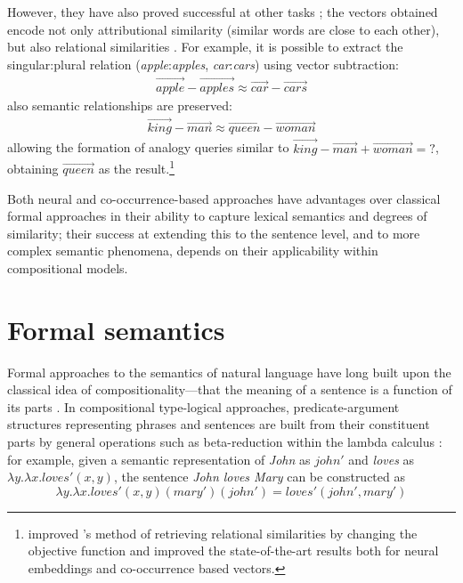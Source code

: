However, they have also proved successful at other tasks
\cite{mikolov2013linguistic}; the vectors obtained encode not only
attributional similarity (similar words are close to each other), but
also relational similarities \cite{turney2006similarity}. For example,
it is possible to extract the singular:plural relation
(\textit{apple}:\textit{apples}, \textit{car}:\textit{cars}) using
vector subtraction:
%
\begin{align*}
  \overrightarrow{\mathit{apple}} - \overrightarrow{\mathit{apples}}
  \approx
  \overrightarrow{\mathit{car}} - \overrightarrow{\mathit{cars}}
\end{align*}
%
also semantic relationships are preserved:
%
\begin{align*}
  \overrightarrow{\mathit{king}} - \overrightarrow{\mathit{man}}
  \approx
  \overrightarrow{\mathit{queen}} - \overrightarrow{\mathit{woman}}
\end{align*}
%
allowing the formation of analogy queries similar to
$\overrightarrow{\mathit{king}} - \overrightarrow{\mathit{man}} +
\overrightarrow{\mathit{woman}} = \mathtt{?}$, obtaining
$\overrightarrow{\mathit{queen}}$ as the
result.\footnote{ improved
  's method of retrieving relational similarities
  by changing the objective function and improved the state-of-the-art results
  both for neural embeddings and co-occurrence based vectors.}

Both neural and co-occurrence-based approaches have advantages over
classical formal approaches in their ability to capture lexical
semantics and degrees of similarity; their success at extending this
to the sentence level, and to more complex semantic phenomena, depends
on their applicability within compositional models.

\section{Formal semantics}
\label{sec:formal-semantics}

Formal approaches to the semantics of natural language have long built upon the
classical idea of compositionality---that the meaning of a sentence is a
function of its parts \cite{Janssen2001}. In compositional type-logical
approaches, predicate-argument structures representing phrases and sentences are
built from their constituent parts by general operations such as beta-reduction
within the lambda calculus \cite{THEO:THEO373}: for example, given a semantic
representation of \emph{John} as $\mathit{john}'$ and \emph{loves} as
$\lambda y.\lambda x.\mathit{loves}'(x, y)$, the sentence \emph{John loves Mary}
can be constructed as
$$
\lambda y.\lambda
x.\mathit{loves}'(x, y)(\mathit{mary}')(\mathit{john}') =
\mathit{loves}'(\mathit{john}', \mathit{mary}')
$$

